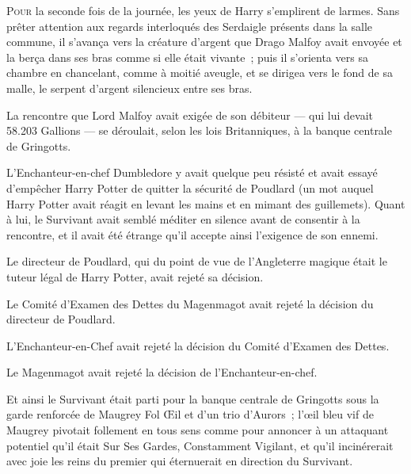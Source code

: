 
\lettrine{P}{our} la seconde fois de la journée, les yeux de Harry s'emplirent de larmes. Sans prêter attention aux regards interloqués des Serdaigle présents dans la salle commune, il s'avança vers la créature d'argent que Drago Malfoy avait envoyée et la berça dans ses bras comme si elle était vivante~; puis il s'orienta vers sa chambre en chancelant, comme à moitié aveugle, et se dirigea vers le fond de sa malle, le serpent d'argent silencieux entre ses bras.


La rencontre que Lord Malfoy avait exigée de son débiteur — qui lui devait 58.203 Gallions — se déroulait, selon les lois Britanniques, à la banque centrale de Gringotts.

L'Enchanteur-en-chef Dumbledore y avait quelque peu résisté et avait essayé d'empêcher Harry Potter de quitter la sécurité de Poudlard (un mot auquel Harry Potter avait réagit en levant les mains et en mimant des guillemets). Quant à lui, le Survivant avait semblé méditer en silence avant de consentir à la rencontre, et il avait été étrange qu'il accepte ainsi l'exigence de son ennemi.

Le directeur de Poudlard, qui du point de vue de l'Angleterre magique était le tuteur légal de Harry Potter, avait rejeté sa décision.

Le Comité d'Examen des Dettes du Magenmagot avait rejeté la décision du directeur de Poudlard.

L'Enchanteur-en-Chef avait rejeté la décision du Comité d'Examen des Dettes.

Le Magenmagot avait rejeté la décision de l'Enchanteur-en-chef.

Et ainsi le Survivant était parti pour la banque centrale de Gringotts sous la garde renforcée de Maugrey Fol Œil et d'un trio d'Aurors~; l'œil bleu vif de Maugrey pivotait follement en tous sens comme pour annoncer à un attaquant potentiel qu'il était Sur Ses Gardes, Constamment Vigilant, et qu'il incinérerait avec joie les reins du premier qui éternuerait en direction du Survivant.


